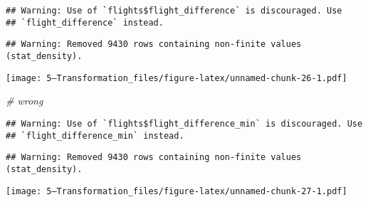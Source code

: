 \documentclass[
]{article}
\newenvironment{Shaded}{\begin{snugshade}}{\end{snugshade}}
\newcommand{\AttributeTok}[1]{\textcolor[rgb]{0.77,0.63,0.00}{#1}}
\newcommand{\CommentTok}[1]{\textcolor[rgb]{0.56,0.35,0.01}{\textit{#1}}}
\newcommand{\DecValTok}[1]{\textcolor[rgb]{0.00,0.00,0.81}{#1}}
\newcommand{\FunctionTok}[1]{\textcolor[rgb]{0.00,0.00,0.00}{#1}}
\newcommand{\NormalTok}[1]{#1}
\newcommand{\OtherTok}[1]{\textcolor[rgb]{0.56,0.35,0.01}{#1}}
\newcommand{\SpecialCharTok}[1]{\textcolor[rgb]{0.00,0.00,0.00}{#1}}
\newcommand{\StringTok}[1]{\textcolor[rgb]{0.31,0.60,0.02}{#1}}
\begin{document}
\begin{verbatim}
## Warning: Use of `flights$flight_difference` is discouraged. Use
## `flight_difference` instead.
\end{verbatim}

\begin{verbatim}
## Warning: Removed 9430 rows containing non-finite values (stat_density).
\end{verbatim}

\texttt{[image: 5---Transformation\_files/figure-latex/unnamed-chunk-26-1.pdf]}

\begin{Shaded}
\begin{Highlighting}[]
\CommentTok{\# wrong}
\end{Highlighting}
\end{Shaded}

\begin{Shaded}
\end{Shaded}

\begin{verbatim}
## Warning: Use of `flights$flight_difference_min` is discouraged. Use
## `flight_difference_min` instead.
\end{verbatim}

\begin{verbatim}
## Warning: Removed 9430 rows containing non-finite values (stat_density).
\end{verbatim}

\texttt{[image: 5---Transformation\_files/figure-latex/unnamed-chunk-27-1.pdf]}
\end{document}
